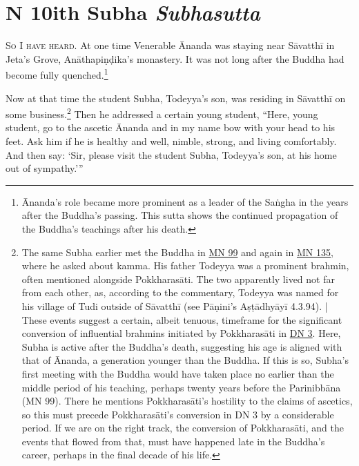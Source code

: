 \documentclass[12pt,openany]{book}%
\newcommand*{\suttatitleacronym}[1]{\smaller[2]{#1}\vspace*{.3em}}
\newcommand*{\suttatitletranslation}[1]{\linebreak{#1}}
\newcommand*{\suttatitleroot}[1]{\linebreak\smaller[2]\itshape{#1}}
\newcommand*{\tocacronym}[1]{\hspace*{-3.3em}{#1}\quad}
\newcommand*{\toctranslation}[1]{#1}
\newcommand*{\tocroot}[1]{(\textit{#1})}
\newcommand*{\scevam}[1]{\textsc{#1}}
\renewcommand*{\tocacronym}[1]{\hspace*{0em}{#1}\quad}%
\begin{document}
%
\chapter*{{\suttatitleacronym DN 10}{\suttatitletranslation With Subha }{\suttatitleroot Subhasutta}}
\addcontentsline{toc}{chapter}{\tocacronym{DN 10} \toctranslation{With Subha } \tocroot{Subhasutta}}

\scevam{So I have heard. }At one time Venerable Ānanda was staying near \textsanskrit{Sāvatthī} in Jeta’s Grove, \textsanskrit{Anāthapiṇḍika}’s monastery. It was not long after the Buddha had become fully quenched.\footnote{Ānanda’s role became more prominent as a leader of the \textsanskrit{Saṅgha} in the years after the Buddha’s passing. This sutta shows the continued propagation of the Buddha’s teachings after his death. } 

Now at that time the student Subha, Todeyya’s son, was residing in \textsanskrit{Sāvatthī} on some business.\footnote{The same Subha earlier met the Buddha in \href{https://suttacentral.net/mn99/en/sujato}{MN 99} and again in \href{https://suttacentral.net/mn135/en/sujato}{MN 135}, where he asked about kamma. His father Todeyya was a prominent brahmin, often mentioned alongside \textsanskrit{Pokkharasāti}. The two apparently lived not far from each other, as, according to the commentary, Todeyya was named for his village of Tudi outside of \textsanskrit{Sāvatthī} (see \textsanskrit{Pāṇini}’s \textsanskrit{Aṣṭādhyāyī} 4.3.94). | These events suggest a certain, albeit tenuous, timeframe for the significant conversion of influential brahmins initiated by \textsanskrit{Pokkharasāti} in \href{https://suttacentral.net/dn3/en/sujato}{DN 3}. Here, Subha is active after the Buddha’s death, suggesting his age is aligned with that of Ānanda, a generation younger than the Buddha. If this is so, Subha’s first meeting with the Buddha would have taken place no earlier than the middle period of his teaching, perhaps twenty years before the \textsanskrit{Parinibbāna} (MN 99). There he mentions \textsanskrit{Pokkharasāti}’s hostility to the claims of ascetics, so this must precede \textsanskrit{Pokkharasāti}’s conversion in DN 3 by a considerable period. If we are on the right track, the conversion of \textsanskrit{Pokkharasāti}, and the events that flowed from that, must have happened late in the Buddha’s career, perhaps in the final decade of his life. } Then he addressed a certain young student, “Here, young student, go to the ascetic Ānanda and in my name bow with your head to his feet. Ask him if he is healthy and well, nimble, strong, and living comfortably. And then say: ‘Sir, please visit the student Subha, Todeyya’s son, at his home out of sympathy.’” 
\end{document}
